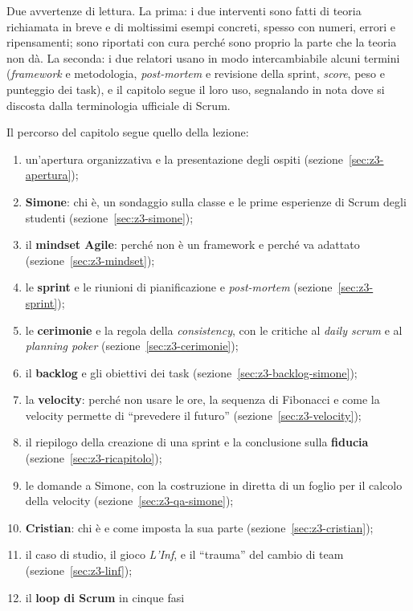 Due avvertenze di lettura. La prima: i due interventi sono fatti di teoria
richiamata in breve e di moltissimi esempi concreti, spesso con numeri,
errori e ripensamenti; sono riportati con cura perché sono proprio la parte
che la teoria non dà. La seconda: i due relatori usano in modo
intercambiabile alcuni termini (\emph{framework} e metodologia,
\emph{post-mortem} e revisione della sprint, \emph{score}, peso e punteggio
dei task), e il capitolo segue il loro uso, segnalando in nota dove si
discosta dalla terminologia ufficiale di Scrum.

Il percorso del capitolo segue quello della lezione:
\begin{enumerate}
  \item un'apertura organizzativa e la presentazione degli ospiti
        (sezione~\ref{sec:z3-apertura});
  \item \textbf{Simone}: chi è, un sondaggio sulla classe e le prime
        esperienze di Scrum degli studenti (sezione~\ref{sec:z3-simone});
  \item il \textbf{mindset Agile}: perché non è un framework e perché va
        adattato (sezione~\ref{sec:z3-mindset});
  \item le \textbf{sprint} e le riunioni di pianificazione e
        \emph{post-mortem} (sezione~\ref{sec:z3-sprint});
  \item le \textbf{cerimonie} e la regola della \emph{consistency}, con le
        critiche al \emph{daily scrum} e al \emph{planning poker}
        (sezione~\ref{sec:z3-cerimonie});
  \item il \textbf{backlog} e gli obiettivi dei task
        (sezione~\ref{sec:z3-backlog-simone});
  \item la \textbf{velocity}: perché non usare le ore, la sequenza di
        Fibonacci e come la velocity permette di ``prevedere il futuro''
        (sezione~\ref{sec:z3-velocity});
  \item il riepilogo della creazione di una sprint e la conclusione sulla
        \textbf{fiducia} (sezione~\ref{sec:z3-ricapitolo});
  \item le domande a Simone, con la costruzione in diretta di un foglio per
        il calcolo della velocity (sezione~\ref{sec:z3-qa-simone});
  \item \textbf{Cristian}: chi è e come imposta la sua parte
        (sezione~\ref{sec:z3-cristian});
  \item il caso di studio, il gioco \emph{L'Inf}, e il ``trauma'' del cambio
        di team (sezione~\ref{sec:z3-linf});
  \item il \textbf{loop di Scrum} in cinque fasi

\end{enumerate}

